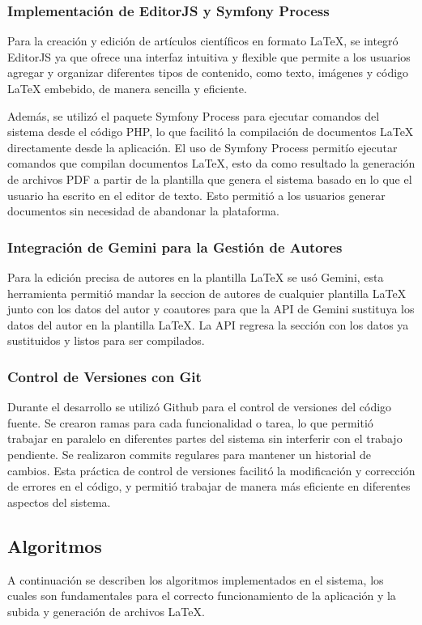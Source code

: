 \subsubsection{Implementación de EditorJS y Symfony Process}
Para la creación y edición de artículos científicos en formato LaTeX, se integró EditorJS ya que ofrece una interfaz intuitiva y flexible que permite a los usuarios agregar y organizar diferentes tipos de contenido, como texto, imágenes y código LaTeX embebido, de manera sencilla y eficiente.

Además, se utilizó el paquete Symfony Process para ejecutar comandos del sistema desde el código PHP, lo que facilitó la compilación de documentos LaTeX directamente desde la aplicación. El uso de Symfony Process permitío ejecutar comandos que compilan documentos LaTeX, esto da como resultado la generación de archivos PDF a partir de la plantilla que genera el sistema basado en lo que el usuario ha escrito en el editor de texto. Esto permitió a los usuarios generar documentos sin necesidad de abandonar la plataforma. 

\subsubsection{Integración de Gemini para la Gestión de Autores}
Para la edición precisa de autores en la plantilla LaTeX se usó Gemini, esta herramienta permitió mandar la seccion de autores de cualquier plantilla LaTeX junto con los datos del autor y coautores para que la API de Gemini sustituya los datos del autor en la plantilla LaTeX. La API regresa la sección con los datos ya sustituidos y listos para ser compilados.

\subsubsection{Control de Versiones con Git}
Durante el desarrollo se utilizó Github para el control de versiones del código fuente. Se crearon ramas para cada funcionalidad o tarea, lo que permitió trabajar en paralelo en diferentes partes del sistema sin interferir con el trabajo pendiente. Se realizaron commits regulares para mantener un historial de cambios. Esta práctica de control de versiones facilitó la modificación y corrección de errores en el código, y permitió trabajar de manera más eficiente en diferentes aspectos del sistema.

\subsection{Algoritmos}
A continuación se describen los algoritmos implementados en el sistema, los cuales son fundamentales para el correcto funcionamiento de la aplicación y la subida y generación de archivos LaTeX.

